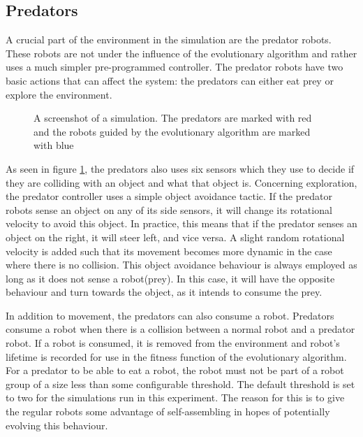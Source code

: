 		
\subsection{Predators}
A crucial part of the environment in the simulation are the predator robots.
These robots are not under the influence of the evolutionary algorithm and rather uses a much simpler pre-programmed controller.
The predator robots have two basic actions that can affect the system: the predators can either eat prey or explore the environment.

\begin{figure}[H]
	\centering
	\caption{A screenshot of a simulation. The predators are marked with red and the robots guided by the evolutionary algorithm are marked with blue}
	\label{fig:predator_screendump}
\end{figure}

As seen in figure \ref{fig:predator_screendump}, the predators also uses six sensors which they use to decide if they are colliding with an object and what that object is.    
Concerning exploration, the predator controller uses a simple object avoidance tactic.
If the predator robots sense an object on any of its side sensors, it will change its rotational velocity to avoid this object.
In practice, this means that if the predator senses an object on the right, it will steer left, and vice versa.
A slight random rotational velocity is added such that its movement becomes more dynamic in the case where there is no collision.
This object avoidance behaviour is always employed as long as it does not sense a robot(prey).
In this case, it will have the opposite behaviour and turn towards the object, as it intends to consume the prey.

In addition to movement, the predators can also consume a robot. 
Predators consume a robot when there is a collision between a normal robot and a predator robot.
If a robot is consumed, it is removed from the environment and robot's lifetime is recorded for use in the fitness function of the evolutionary algorithm. 
For a predator to be able to eat a robot, the robot must not be part of a robot group of a size less than some configurable threshold.
The default threshold is set to two for the simulations run in this experiment.
The reason for this is to give the regular robots some advantage of self-assembling in hopes of potentially evolving this behaviour. 


